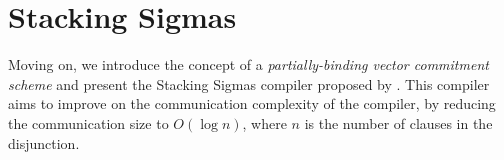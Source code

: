 \section{Stacking Sigmas}
Moving on, we introduce the concept of a \emph{partially-binding vector commitment scheme} 
and present the Stacking Sigmas compiler proposed by \cite{StackingSigmas}. This compiler aims to improve on the 
communication complexity of the \cite{CDS94} compiler, by reducing the communication size to $O(\log n)$, where $n$ is the 
number of clauses in the disjunction. 



% 
% 
% 

